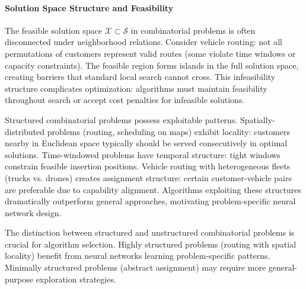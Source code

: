 \paragraph{Solution Space Structure and Feasibility}

The feasible solution space $\mathcal{X} \subset \mathcal{S}$ in combinatorial problems is often disconnected under neighborhood relations. Consider vehicle routing: not all permutations of customers represent valid routes (some violate time windows or capacity constraints). The feasible region forms islands in the full solution space, creating barriers that standard local search cannot cross. This infeasibility structure complicates optimization: algorithms must maintain feasibility throughout search or accept cost penalties for infeasible solutions.

Structured combinatorial problems possess exploitable patterns. Spatially-distributed problems (routing, scheduling on maps) exhibit locality: customers nearby in Euclidean space typically should be served consecutively in optimal solutions. Time-windowed problems have temporal structure: tight windows constrain feasible insertion positions. Vehicle routing with heterogeneous fleets (trucks vs. drones) creates assignment structure: certain customer-vehicle pairs are preferable due to capability alignment. Algorithms exploiting these structures dramatically outperform general approaches, motivating problem-specific neural network design.

The distinction between structured and unstructured combinatorial problems is crucial for algorithm selection. Highly structured problems (routing with spatial locality) benefit from neural networks learning problem-specific patterns. Minimally structured problems (abstract assignment) may require more general-purpose exploration strategies.
